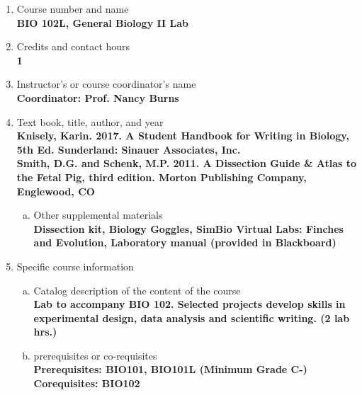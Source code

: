 \label{BIO102L}  %
\begin{enumerate}[1.]
\item Course number and name\\
  {\bfseries
    BIO 102L, General Biology II Lab
  }

\item Credits and contact hours\\
  {\bfseries
    1
  }

\item Instructor's or course coordinator's name\\
  {\bfseries
    Coordinator: Prof. Nancy Burns
  }

\item Text book, title, author, and year\\
  {\bfseries
    Knisely, Karin. 2017. A Student Handbook for Writing in Biology, 5th Ed. Sunderland: Sinauer Associates,
Inc.\\
    Smith, D.G. and Schenk, M.P. 2011. A Dissection Guide \& Atlas to the Fetal Pig, third edition. Morton
Publishing Company, Englewood, CO
  }
\begin{enumerate}[a.]
\item Other supplemental materials\\
  {\bfseries
    Dissection kit, Biology Goggles, SimBio Virtual Labs: Finches and Evolution, Laboratory manual (provided in Blackboard)
  }
\end{enumerate}

\item Specific course information
\begin{enumerate}[a.]
\item Catalog description of the content of the course\\
  {\bfseries
Lab to accompany BIO 102. Selected projects develop skills in experimental design, data analysis and scientific writing. (2 lab hrs.)
  }

\item prerequisites or co-requisites\\
  {\bfseries
    Prerequisites: BIO101, BIO101L (Minimum Grade C-)\\
    Corequisites: BIO102
  }


\end{enumerate}
\end{enumerate}
